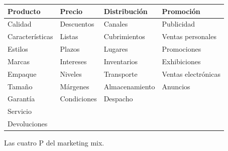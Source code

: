 \documentclass[10pt, spanish, a5paper]{article}
\begin{document}
\begin{figure*}[t]
	\centering
	{\footnotesize 
				
		\begin{tabular*}{\linewidth}{p{.2\linewidth} p{.2\linewidth} p{.2\linewidth} p{.3\linewidth}}
			\toprule[1pt]
			\textbf{Producto} & \textbf{Precio} & \textbf{Distribución} & \textbf{Promoción}  \\ \midrule
			Calidad           & Descuentos      & Canales               & Publicidad          \\ \midrule
			Características   & Listas          & Cubrimientos          & Ventas personales   \\ \midrule
			Estilos           & Plazos          & Lugares               & Promociones         \\ \midrule
			Marcas            & Intereses       & Inventarios           & Exhibiciones        \\ \midrule
			Empaque           & Niveles         & Transporte            & Ventas electrónicas \\ \midrule
			Tamaño            & Márgenes        & Almacenamiento        & Anuncios            \\ \midrule
			Garantía          & Condiciones     & Despacho              &  \\ \midrule
			Servicio          &                 &                       &  \\ \midrule
			Devoluciones      &                 &                       &  \\ \midrule
		\end{tabular*}
		
	}
	
	
	
	\caption[Las cuatro P]{Las cuatro P del marketing mix.}
	\label{fig:tiposempresa}
\end{figure*}
































\newpage



\end{document}
